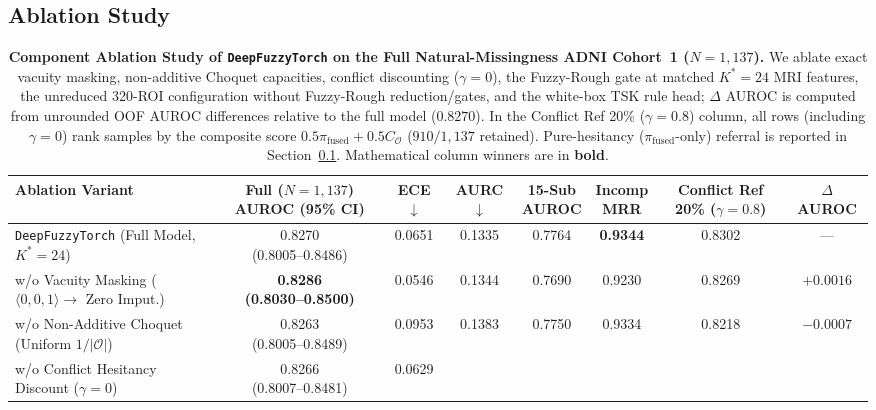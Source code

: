\documentclass[10pt,twocolumn]{article}
\begin{document}
\subsection{Ablation Study}
\label{sec:ablation}
\begin{table}[t]
\centering
\caption{\textbf{Component Ablation Study of \texttt{DeepFuzzyTorch} on the Full
Natural-Missingness
ADNI Cohort~1 ($N=1,137$).} We ablate exact vacuity masking, non-additive Choquet capacities,
conflict discounting ($\gamma=0$), the Fuzzy-Rough gate at matched $K^*=24$ MRI
features, the unreduced 320-ROI configuration without Fuzzy-Rough reduction/gates, and the
white-box TSK rule head; $\Delta$ AUROC is computed from unrounded OOF AUROC differences
relative to the full model ($0.8270$). In the Conflict Ref 20\% ($\gamma=0.8$) column, all
rows (including $\gamma=0$) rank samples by the composite score $0.5\pi_{\text{fused}} +
0.5 C_{\mathcal{O}}$ ($910/1,137$ retained). Pure-hesitancy ($\pi_{\text{fused}}$-only)
referral is reported in Section~\ref{sec:ablation}. Mathematical column winners are in
\textbf{bold}.}
\label{tab:ablation}
\scriptsize
\setlength{\tabcolsep}{4.0pt}
\begin{tabular}{@{}>{\raggedright\arraybackslash}p{4.8cm}ccccccc@{}}
\toprule
\textbf{Ablation Variant} & \shortstack{\textbf{Full ($N=1,137$)}\\\textbf{AUROC (95\%
CI)}} & \textbf{ECE} $\downarrow$ & \textbf{AURC} $\downarrow$ &
\shortstack{\textbf{15-Sub}\\\textbf{AUROC}} & \shortstack{\textbf{Incomp}\\\textbf{MRR}} &
\shortstack{\textbf{Conflict Ref}\\\textbf{20\%
($\gamma=0.8$)}} & \textbf{$\Delta$ AUROC} \\
\midrule
\texttt{DeepFuzzyTorch} (Full Model, $K^*=24$) & \shortstack{0.8270\\(0.8005--0.8486)} & 0.0651
& 0.1335 & 0.7764 & \textbf{0.9344} & 0.8302 & --- \\
w/o Vacuity Masking ($\langle 0,0,1\rangle \to$ Zero Imput.) &
\shortstack{\textbf{0.8286}\\\textbf{(0.8030--0.8500)}} & 0.0546 & 0.1344 & 0.7690 & 0.9230 &
0.8269 & $+0.0016$ \\
w/o Non-Additive Choquet (Uniform $1/|\mathcal{O}|$) & \shortstack{0.8263\\(0.8005--0.8489)} &
0.0953 & 0.1383 & 0.7750 & 0.9334 & 0.8218 & $-0.0007$ \\
w/o Conflict Hesitancy Discount ($\gamma = 0$) & \shortstack{0.8266\\(0.8007--0.8481)} & 0.0629

\end{tabular}
\end{table}
\end{document}
